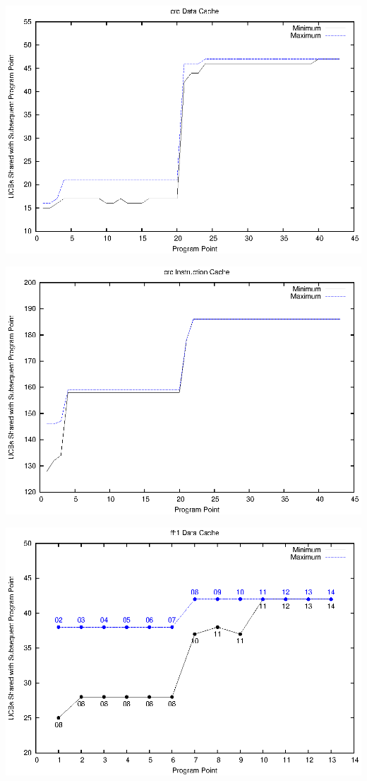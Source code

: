 \begin{center}
  \includegraphics[width=\linewidth]{eps/crc-dcache.eps}
\end{center}

\begin{center}
  \includegraphics[width=\linewidth]{eps/crc-icache.eps}
\end{center}

\begin{center}
  \includegraphics[width=\linewidth]{eps/fft1-dcache.eps}
\end{center}

